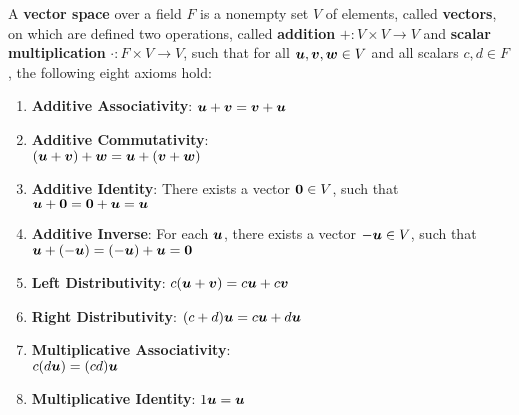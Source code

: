 \begin{Def}\label{def:vectorspace} A \textbf{vector space} over a field $F$ is a nonempty set $V$ of elements, called \textbf{vectors}, on which are defined two operations, called \textbf{addition} $+ : V\times V \to V$ and \textbf{scalar multiplication} $\cdot : F\times V \to V$, such that for all $\boldsymbol u, \boldsymbol v, \boldsymbol w \in V$ and all scalars $c, d\in F$, the following eight axioms hold:
\setlength{\columnsep}{30pt}
\begin{multicols}{2}
\begin{enumerate}[!DEF!, start=1]
\item\label{item:vsaddassoc} \textbf{Additive Associativity}: $\boldsymbol u + \boldsymbol v = \boldsymbol v + \boldsymbol u$ 
\item\label{item:vsaddcomm} \textbf{Additive Commutativity}:\\ \mbox{}\hfill$(\boldsymbol u + \boldsymbol v) + \boldsymbol w = \boldsymbol u + (\boldsymbol v +  \boldsymbol w)$ 
\item\label{item:vsaddident} \textbf{Additive Identity}: There exists  a vector $\boldsymbol 0\in V$, such that $\boldsymbol u + \boldsymbol 0 = \boldsymbol 0 + \boldsymbol u = \boldsymbol u$ 
\item\label{item:vsaddinv} \textbf{Additive Inverse}: For each $\boldsymbol u$, there exists a vector $-\boldsymbol u\in V$, such that\\ \mbox{}\hfill$\boldsymbol u + (-\boldsymbol u) = (-\boldsymbol u) + \boldsymbol u = \boldsymbol 0$ \columnbreak
\item\label{item:vsleftdist} \textbf{Left Distributivity}: $c(\boldsymbol u + \boldsymbol v) = c\boldsymbol u + c\boldsymbol v$ 
\item\label{item:vsrightdist} \textbf{Right Distributivity}: $(c+d)\boldsymbol u = c\boldsymbol u + d\boldsymbol u$
\item\label{item:vsmultassoc} \textbf{Multiplicative Associativity}:\\ \mbox{}\hfill$c(d\boldsymbol u) = (cd)\boldsymbol u$ 
\item\label{item:vsmultiden} \textbf{Multiplicative Identity}: $1\boldsymbol u = \boldsymbol u$\\\\
\end{enumerate}
\end{multicols}
\end{Def}

